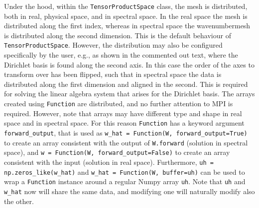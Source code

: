 \documentclass[%
oneside,                 %
final,                   %
10pt]{article}
\begin{document}
Under the hood, within the \texttt{TensorProductSpace} class, the mesh is distributed, both in real, physical space, and in spectral space. In the real space the mesh is distributed along the first index, whereas in spectral space the wavenumbermesh is distributed along the second dimension. This is the default behaviour of \texttt{TensorProductSpace}. However, the distribution may also be configured specifically by the user, e.g., as shown in the commented out text, where the Dirichlet basis is found along the second axis. In this case the order of the axes to transform over has been flipped, such that in spectral space the data is distributed along the first dimension and aligned in the second. This is required for solving the linear algebra system that arises for the Dirichlet basis. The arrays created using \texttt{Function} are distributed, and no further attention to MPI is required. However, note that arrays may have different type and shape in real space and in spectral space. For this reason \texttt{Function} has a keyword argument \Verb!forward_output!, that is used as \Verb!w_hat = Function(W, forward_output=True)! to create an array consistent with the output of \texttt{W.forward} (solution in spectral space), and \Verb!w = Function(W, forward_output=False)! to create an array consistent with the input (solution in real space). Furthermore, \Verb!uh = np.zeros_like(w_hat)! and \Verb!w_hat = Function(W, buffer=uh)! can be used to wrap a \texttt{Function} instance around a regular Numpy array \texttt{uh}. Note that \texttt{uh} and \Verb!w_hat! now will share the same data, and modifying one will naturally modify also the other. 
\end{document}
